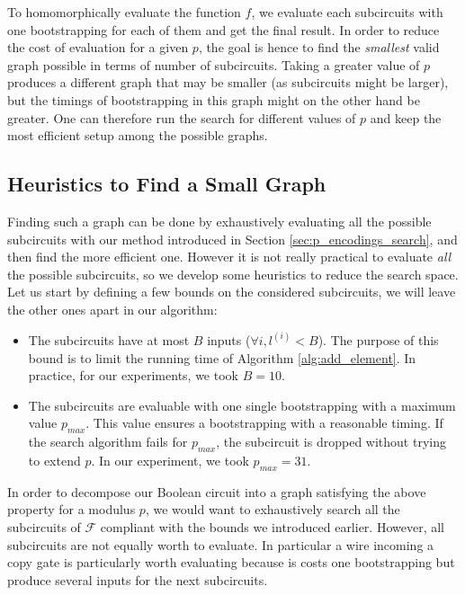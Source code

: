 To homomorphically evaluate the function $f$, we evaluate each subcircuits with one bootstrapping for each of them and get the final result. In order to reduce the cost of evaluation for a given $p$, the goal is hence to find the \emph{smallest} valid graph possible in terms of number of subcircuits. Taking a greater value of $p$ produces a different graph that may be smaller (as subcircuits might be larger), but the timings of bootstrapping in this graph might on the other hand be greater. One can therefore run the search for different values of $p$ and keep the most efficient setup among the possible graphs. %

\subsection{Heuristics to Find a Small Graph}
\label{sec:heuristics_graph}

Finding such a graph can be done by exhaustively evaluating all the possible subcircuits with our method introduced in Section \ref{sec:p_encodings_search}, and then find the more efficient one. However it is not really practical to evaluate \emph{all} the possible subcircuits, so we develop some heuristics to reduce the search space. Let us start by defining a few bounds on the considered subcircuits, we will leave the other ones apart in our algorithm:

\begin{itemize}
    \item The subcircuits have at most $B$ inputs ($\forall i, l^{(i)} < B$). The purpose of this bound is to limit the running time of Algorithm \ref{alg:add_element}. In practice, for our experiments, we took $B = 10$.
    \item The subcircuits are evaluable with one single bootstrapping with a maximum value $p_{max}$. This value ensures a bootstrapping with a reasonable timing. If the search algorithm fails for $p_{max}$, the subcircuit is dropped without trying to extend $p$. In our experiment, we took $p_{max}=31$.
\end{itemize}


In order to decompose our Boolean circuit into a graph satisfying the above property for a modulus $p$, we would want to exhaustively search all the subcircuits of $\mathcal{F}$ compliant with the bounds we introduced earlier. However, all subcircuits are not equally worth to evaluate. In particular a wire incoming a copy gate is particularly worth evaluating because is costs one bootstrapping but produce several inputs for the next subcircuits. 

